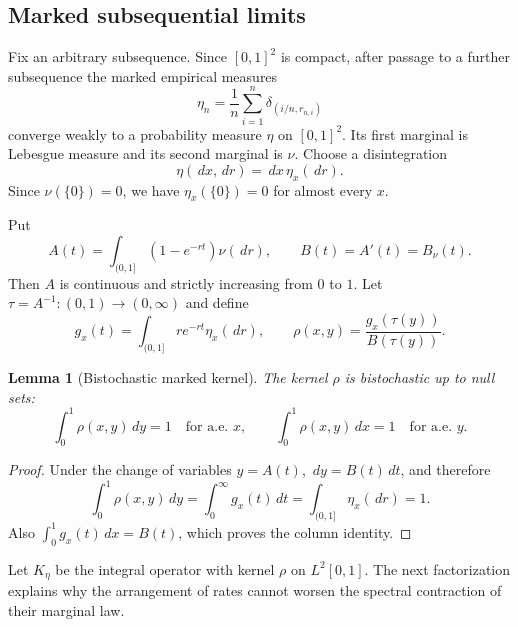 \documentclass[11pt]{article}
\newtheorem{lemma}[theorem]{Lemma}
\theoremstyle{definition}
\theoremstyle{remark}
\newcommand{\dd}{\,d}
\begin{document}
\subsection{Marked subsequential limits}

Fix an arbitrary subsequence.  Since $[0,1]^2$ is compact, after passage to a
further subsequence the marked empirical measures
\begin{equation}
  \eta_n=\frac1n\sum_{i=1}^n\delta_{(i/n,r_{n,i})}
  \label{eq:marked-empirical}
\end{equation}
converge weakly to a probability measure $\eta$ on $[0,1]^2$.  Its first
marginal is Lebesgue measure and its second marginal is $\nu$.  Choose a
disintegration
\begin{equation}
  \eta(\dd x,\dd r)=\dd x\,\eta_x(\dd r).
  \label{eq:disintegration}
\end{equation}
Since $\nu(\{0\})=0$, we have $\eta_x(\{0\})=0$ for almost every $x$.

Put
\begin{equation}
  A(t)=\int_{(0,1]}(1-e^{-rt})\nu(\dd r),
  \qquad B(t)=A'(t)=B_\nu(t).
  \label{eq:A-and-B}
\end{equation}
Then $A$ is continuous and strictly increasing from $0$ to $1$.  Let
$\tau=A^{-1}:(0,1)\to(0,\infty)$ and define
\begin{equation}
  g_x(t)=\int_{(0,1]}r e^{-rt}\eta_x(\dd r),
  \qquad
  \rho(x,y)=\frac{g_x(\tau(y))}{B(\tau(y))}.
  \label{eq:marked-kernel}
\end{equation}

\begin{lemma}[Bistochastic marked kernel]
\label{lem:bistochastic}
The kernel $\rho$ is bistochastic up to null sets:
\[
  \int_0^1\rho(x,y)\dd y=1
  \quad\text{for a.e. }x,
  \qquad
  \int_0^1\rho(x,y)\dd x=1
  \quad\text{for a.e. }y.
\]
\end{lemma}

\begin{proof}
Under the change of variables $y=A(t)$, $\dd y=B(t)\dd t$, and therefore
\[
 \int_0^1\rho(x,y)\dd y
 =\int_0^\infty g_x(t)\dd t
 =\int_{(0,1]}\eta_x(\dd r)=1.
\]
Also $\int_0^1g_x(t)\dd x=B(t)$, which proves the column identity.
\end{proof}

Let $K_\eta$ be the integral operator with kernel $\rho$ on $L^2[0,1]$.
The next factorization explains why the arrangement of rates cannot worsen the
spectral contraction of their marginal law.
\end{document}
